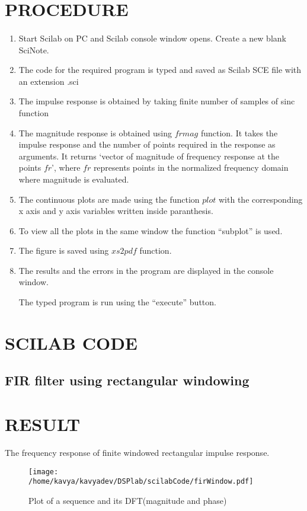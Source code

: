 \section{PROCEDURE}

\paragraph{}
\begin{enumerate}
\item
Start Scilab on PC and Scilab console window opens. Create a new blank SciNote.
\item
The code for the required program is typed and saved as Scilab SCE file with an extension .sci
\item
The impulse response is obtained by taking finite number of samples of sinc function
\item
The magnitude response is obtained using  $frmag$ function. It takes the impulse response and the number of points required in the response as arguments. It returns `vector of magnitude of frequency response at the points $fr$', where $fr$ represents points in the normalized frequency domain where magnitude is evaluated.
\item
The continuous plots are made using the function $plot$ with the corresponding x axis and y axis variables written inside paranthesis.

\item
To view all the plots in the same window the function “subplot” is used.
\item
The figure is saved using $xs2pdf$ function.
\item
The results and the errors in the program are displayed in the console window.

The typed program is run using the “execute” button.
\end{enumerate}

\section{SCILAB CODE}
\subsection{FIR filter using rectangular windowing}





\section{RESULT}
The frequency response of finite windowed rectangular impulse response.

\begin{figure}
\texttt{[image: /home/kavya/kavyadev/DSPlab/scilabCode/firWindow.pdf]}
\caption{Plot of a sequence and its DFT(magnitude and phase)}
\label{dft_sequence}
\end{figure}
